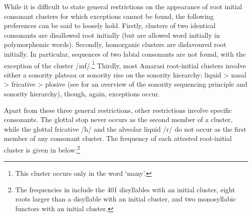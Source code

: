 \newpage
While it is difficult to state general restrictions on the appearance of root
initial consonant clusters for which exceptions cannot be found,
the following preferences can be said to loosely hold.
Firstly, clusters of two identical consonants are disallowed root initially
(but are allowed word initially in polymorphemic words).
Secondly, homorganic clusters are disfavoured root initially.
In particular, sequences of two labial consonants are not found,
with the exception of the cluster /mf/.\footnote{
		This cluster occurs only in the word  `many'.}
Thirdly, most Amarasi root-initial clusters involve either
a sonority plateau or sonority rise on the sonority hierarchy:
liquid {\textgreater} nasal {\textgreater} fricative {\textgreater} plosive
(see \citealt[210f]{ble95} for an overview of the sonority sequencing principle and sonority hierarchy),
though, again, exceptions occur.

Apart from these three general restrictions,
other restrictions involve specific consonants.
The glottal stop never occurs as the second member of a cluster,
while the glottal fricative /h/ and the alveolar liquid /r/
do not occur as the first member of any consonant cluster.
The frequency of each attested root-initial cluster
is given in  below.\footnote{
		The frequencies in  include the 401 disyllables with an initial
		cluster, eight roots larger than a disyllable with an initial
		cluster, and two monosyllabic functors with an initial cluster.}


